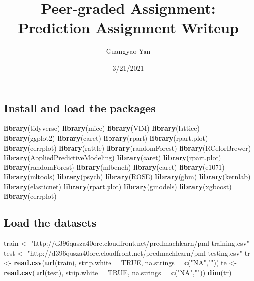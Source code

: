 \documentclass[]{article}
\title{Peer-graded Assignment: Prediction Assignment Writeup}
\author{Guangyao Yan}
\date{3/21/2021}
\newenvironment{Shaded}{\begin{snugshade}}{\end{snugshade}}
\newcommand{\DataTypeTok}[1]{\textcolor[rgb]{0.13,0.29,0.53}{#1}}
\newcommand{\KeywordTok}[1]{\textcolor[rgb]{0.13,0.29,0.53}{\textbf{#1}}}
\newcommand{\NormalTok}[1]{#1}
\newcommand{\OtherTok}[1]{\textcolor[rgb]{0.56,0.35,0.01}{#1}}
\newcommand{\StringTok}[1]{\textcolor[rgb]{0.31,0.60,0.02}{#1}}
\begin{document}
\maketitle

\hypertarget{install-and-load-the-packages}{%
\subsection{Install and load the
packages}\label{install-and-load-the-packages}}

\begin{Shaded}
\begin{Highlighting}[]
\KeywordTok{library}\NormalTok{(tidyverse)}
\KeywordTok{library}\NormalTok{(mice)}
\KeywordTok{library}\NormalTok{(VIM)}
\KeywordTok{library}\NormalTok{(lattice)}
\KeywordTok{library}\NormalTok{(ggplot2)}
\KeywordTok{library}\NormalTok{(caret)}
\KeywordTok{library}\NormalTok{(rpart)}
\KeywordTok{library}\NormalTok{(rpart.plot)}
\KeywordTok{library}\NormalTok{(corrplot)}
\KeywordTok{library}\NormalTok{(rattle)}
\KeywordTok{library}\NormalTok{(randomForest)}
\KeywordTok{library}\NormalTok{(RColorBrewer)}
\KeywordTok{library}\NormalTok{(AppliedPredictiveModeling)}
\KeywordTok{library}\NormalTok{(caret)}
\KeywordTok{library}\NormalTok{(rpart.plot)}
\KeywordTok{library}\NormalTok{(randomForest)}
\KeywordTok{library}\NormalTok{(mlbench)}
\KeywordTok{library}\NormalTok{(caret)}
\KeywordTok{library}\NormalTok{(e1071)}
\KeywordTok{library}\NormalTok{(mltools)}
\KeywordTok{library}\NormalTok{(psych)}
\KeywordTok{library}\NormalTok{(ROSE)}
\KeywordTok{library}\NormalTok{(gbm)}
\KeywordTok{library}\NormalTok{(kernlab)}
\KeywordTok{library}\NormalTok{(elasticnet)}
\KeywordTok{library}\NormalTok{(rpart.plot)}
\KeywordTok{library}\NormalTok{(gmodels)}
\KeywordTok{library}\NormalTok{(xgboost)}
\KeywordTok{library}\NormalTok{(corrplot)}
\end{Highlighting}
\end{Shaded}

\hypertarget{load-the-datasets}{%
\subsection{Load the datasets}\label{load-the-datasets}}

\begin{Shaded}
\begin{Highlighting}[]
\NormalTok{train <-}\StringTok{ "http://d396qusza40orc.cloudfront.net/predmachlearn/pml-training.csv"}
\NormalTok{test  <-}\StringTok{ "http://d396qusza40orc.cloudfront.net/predmachlearn/pml-testing.csv"}
\NormalTok{tr <-}\StringTok{ }\KeywordTok{read.csv}\NormalTok{(}\KeywordTok{url}\NormalTok{(train), }\DataTypeTok{strip.white =} \OtherTok{TRUE}\NormalTok{, }\DataTypeTok{na.strings =} \KeywordTok{c}\NormalTok{(}\StringTok{"NA"}\NormalTok{,}\StringTok{""}\NormalTok{))}
\NormalTok{te  <-}\StringTok{ }\KeywordTok{read.csv}\NormalTok{(}\KeywordTok{url}\NormalTok{(test),  }\DataTypeTok{strip.white =} \OtherTok{TRUE}\NormalTok{, }\DataTypeTok{na.strings =} \KeywordTok{c}\NormalTok{(}\StringTok{"NA"}\NormalTok{,}\StringTok{""}\NormalTok{))}
\KeywordTok{dim}\NormalTok{(tr)}
\end{Highlighting}
\end{Shaded}
\end{document}
